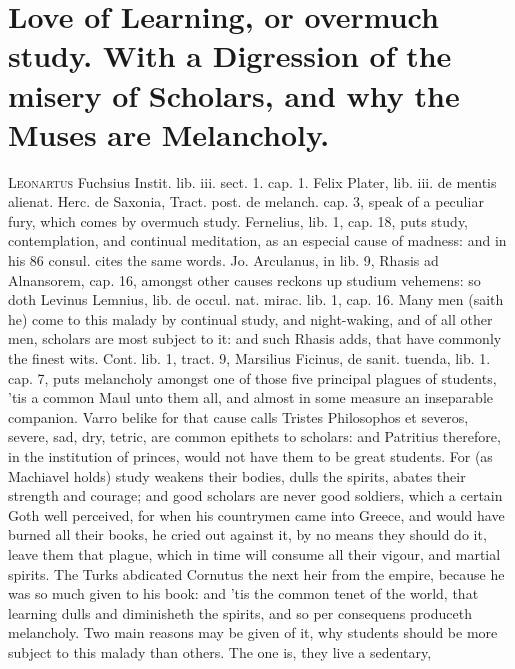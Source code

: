 {%
\section[Love of Learning, or overmuch study.]{Love of Learning, or overmuch study. With a Digression of the misery of Scholars, and why the Muses are Melancholy.}
\lettrine{L}{eonartus} Fuchsius Instit. lib. iii. sect. 1. cap. 1. Felix Plater,
lib. iii. de mentis alienat. Herc. de Saxonia, Tract. post. de melanch.
cap. 3, speak of a peculiar fury, which comes by overmuch study.
Fernelius, lib. 1, cap. 18, puts study, contemplation, and
continual meditation, as an especial cause of madness: and in his 86
consul. cites the same words. Jo. Arculanus, in lib. 9, Rhasis ad
Alnansorem, cap. 16, amongst other causes reckons up studium vehemens:
so doth Levinus Lemnius, lib. de occul. nat. mirac. lib. 1, cap. 16.
Many men (saith he) come to this malady by continual study,
and night-waking, and of all other men, scholars are most subject to
it: and such Rhasis adds, that have commonly the finest wits.
Cont. lib. 1, tract. 9, Marsilius Ficinus, de sanit. tuenda, lib. 1.
cap. 7, puts melancholy amongst one of those five principal plagues of
students, 'tis a common Maul unto them all, and almost in some measure
an inseparable companion. Varro belike for that cause calls Tristes
Philosophos et severos, severe, sad, dry, tetric, are common epithets
to scholars: and Patritius therefore, in the institution of
princes, would not have them to be great students. For (as Machiavel
holds) study weakens their bodies, dulls the spirits, abates their
strength and courage; and good scholars are never good soldiers, which
a certain Goth well perceived, for when his countrymen came into
Greece, and would have burned all their books, he cried out against it,
by no means they should do it,  leave them that plague, which in
time will consume all their vigour, and martial spirits. The
Turks abdicated Cornutus the next heir from the empire, because
he was so much given to his book: and 'tis the common tenet of the
world, that learning dulls and diminisheth the spirits, and so per
consequens produceth melancholy.
Two main reasons may be given of it, why students should be more
subject to this malady than others. The one is, they live a sedentary,
}
